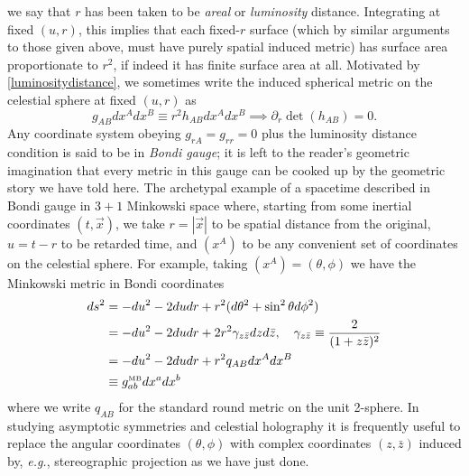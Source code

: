 \documentclass[11pt,letterpaper]{article}
\newcommand{\LP}{\left(}
\newcommand{\RP}{\right)}
\newcommand{\D}{\partial}
\begin{document}
we say that $r$ has been taken to be \textit{areal} or \textit{luminosity} distance. Integrating at fixed $(u,r)$, this implies that each fixed-$r$ surface (which by similar arguments to those given above, must have purely spatial induced metric) has surface area proportionate to $r^2$, if indeed it has finite surface area at all. %
Motivated by \eqref{luminositydistance}, we sometimes write the induced spherical metric on the celestial sphere at fixed $(u,r)$ as \begin{equation}
g_{AB} dx^A dx^B \equiv r^2 h_{AB} dx^A dx^B \implies \D_r \det (h_{AB}) = 0.
\end{equation}
Any coordinate system obeying $g_{rA} = g_{rr} = 0$ plus the luminosity distance condition is said to be in \textit{Bondi gauge}; it is left to the reader's geometric imagination that every metric in this gauge can be cooked up by the geometric story we have told here.
The archetypal example of a spacetime described in Bondi gauge in $3+1$ Minkowski space where, starting from some inertial coordinates $(t, \vec{x})$, we take $r = |\vec{x}|$ to be spatial distance from the original, $u = t - r$ to be retarded time, and $(x^A)$ to be any convenient set of coordinates on the celestial sphere. For example, taking $(x^A) = (\theta, \phi)$ we have the Minkowski metric in Bondi coordinates \begin{equation}\label{Minkowskibondi}
\begin{aligned}
ds^2 & = - du^2 - 2 du dr + r^2 (d \theta^2 + \sin^2 \theta d \phi^2) \\
& = - du^2 - 2 du dr + 2 r^2 \gamma_{z \bar{z}} dz d \bar{z} , \quad \gamma_{z \bar{z}} \equiv \frac{2}{(1 + z \bar{z})^2} \\
& = - du^2 - 2 du dr + r^2 q_{AB} dx^A dx^B \\
& \equiv g_{ab}^{\mbox{\tiny{MB}}} dx^a dx^b
\end{aligned}
\end{equation}
where we write $q_{AB}$ for the standard round metric on the unit 2-sphere. In studying asymptotic symmetries and celestial holography it is frequently useful to replace the angular coordinates $(\theta, \phi)$ with complex coordinates $(z, \bar{z})$ induced by, \textit{e.g.}, stereographic projection as we have just done.
\end{document}
